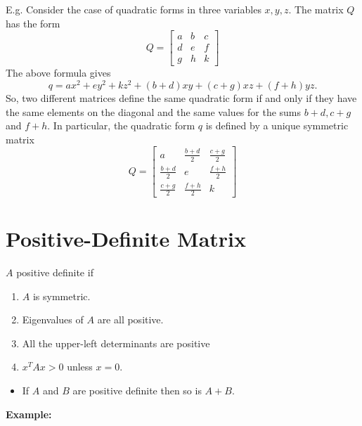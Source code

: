 \documentclass[13pt]{article}
\theoremstyle{definition}
\theoremstyle{remark}
\begin{document}
\begin{multicols}{2}
E.g. Consider the case of quadratic forms in three variables $x, y, z$. The matrix $Q$ has the form
$$
Q=\begin{bmatrix}
a & b & c \\
d & e & f \\
g & h & k
\end{bmatrix}
$$
The above formula gives
$$
q=a x^2+e y^2+k z^2+(b+d) x y+(c+g) x z+(f+h) y z .
$$
So, two different matrices define the same quadratic form if and only if they have the same elements on the diagonal and the same values for the sums $b+d, c+g$ and $f+h$. In particular, the quadratic form $q$ is defined by a {\color{blue}unique} symmetric matrix
$$
Q=\begin{bmatrix}
a & \frac{b+d}{2} & \frac{c+g}{2} \\
\frac{b+d}{2} & e & \frac{f+h}{2} \\
\frac{c+g}{2} & \frac{f+h}{2} & k
\end{bmatrix}
$$

\section{Positive-Definite Matrix}
$A$ positive definite if 
\begin{enumerate}
    \item $A$ is symmetric.
    \item Eigenvalues of $A$ are all positive.
    \item All the upper-left determinants are positive
    \item $x^{T} A x>0$ unless $x=0$.
\end{enumerate}

\begin{itemize}
  \item  If $A$ and $B$ are positive definite then so is $A+B$. 
\end{itemize}

    
\end{multicols}
\textbf{Example:}
\end{document}
